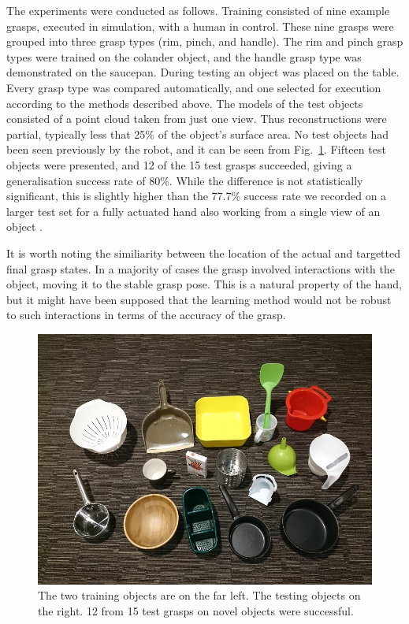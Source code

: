 The experiments were conducted as follows. Training consisted of nine example grasps, executed in simulation, with a human in control. These nine grasps were grouped into three grasp types (rim, pinch, and handle). The rim and pinch grasp types were trained on the colander object, and the handle grasp type was demonstrated on the saucepan. During testing an object was placed on the table. Every grasp type was compared automatically, and one selected for execution according to the methods described above. The models of the test objects consisted of a point cloud taken from just one view. Thus reconstructions were partial, typically less that 25\% of the object's surface area. No test objects had been seen previously by the robot, and it can be seen from Fig.~\ref{fig:test}. Fifteen test objects were presented, and 12 of the 15 test grasps succeeded, giving a generalisation success rate of 80\%. While the difference is not statistically significant, this is slightly higher than the 77.7\% success rate we recorded on a larger test set for a fully actuated hand also working from a single view of an object \cite{kopicki-detry-wyatt-etal-ijrr-2015}.

It is worth noting the similiarity between the location of the actual and targetted final grasp states. In a majority of cases the grasp involved interactions with the object, moving it to the stable grasp pose. This is a natural property of the hand, but it might have been supposed that the learning method would not be robust to such interactions in terms of the accuracy of the grasp. 

\begin{figure}
\begin{center}
 \includegraphics[width=0.9\columnwidth]{images/object_set_small}
 \caption{The two training objects are on the far left. The testing objects on the right. 12 from 15 test grasps on novel objects were successful.}
 \label{fig:test}
 \end{center}
\end{figure}

